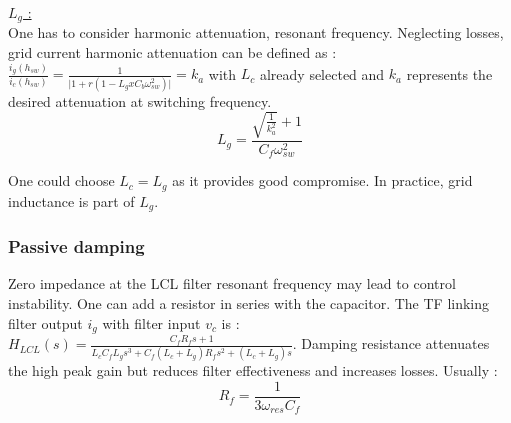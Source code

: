 \documentclass[../main.tex]{subfiles}
\begin{document}
\quad \underline{$L_g$ :}\\
One has to consider harmonic attenuation, resonant frequency. Neglecting losses, grid current harmonic attenuation can be defined as : $\frac{i_g(h_{sw})}{i_c(h_{sw})} = \frac{1}{\lvert 1+ r(1-L_g x C_b \omega_{sw}^2)\rvert} = k_a$ with $L_c$ already selected and $k_a$ represents the desired attenuation at switching frequency.\begin{equation}
    L_g = \frac{\sqrt{\frac{1}{k_a^2}} +1}{C_f \omega_{sw}^2}
\end{equation}

One could choose $L_c = L_g$ as it provides good compromise. In practice, grid inductance is part of $L_g$.\\

\subsubsection{Passive damping}
Zero impedance at the LCL filter resonant frequency may lead to control instability. One can add a resistor in series with the capacitor. The TF linking filter output $i_g$ with filter input $v_c$ is : $H_{LCL}(s) = \frac{C_f R_f s +1}{L_c C_f L_g s^3 + C_f (L_c+L_g) R_f s^2 + (L_c+L_g)s}$. Damping resistance attenuates the high peak gain but reduces filter effectiveness and increases losses. Usually : \begin{equation}
    R_f = \frac{1}{3\omega_{res} C_f}
\end{equation}
\end{document}
